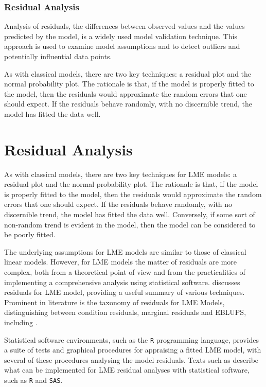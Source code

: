 \documentclass[12pt, a4paper]{report}
\theoremstyle{plain}
\theoremstyle{definition}
\theoremstyle{remark}
\begin{document}
\subsubsection{Residual Analysis}
Analysis of residuals, the differences between observed values and the values predicted by the model, is a widely used model validation technique. This approach is used to examine model assumptions and to detect outliers and potentially influential data points. 

As with classical models, there are two key techniques: a residual plot and the normal probability plot. The rationale is that, if the model is properly fitted to the model, then the residuals would approximate the random errors that one should expect. If the residuals behave randomly, with no discernible trend, the model has fitted the data well. 
	
\section{Residual Analysis}
As with classical models, there are two key techniques for LME models: a residual plot and the normal probability plot. The rationale is that, if the model is properly fitted to the model, then the residuals would approximate the random errors that one should expect.
If the residuals behave randomly, with no discernible trend, the model has fitted the data well. Conversely, if some sort of non-random trend is evident in the model, then the model can be considered to be poorly fitted. 

The underlying assumptions for LME models are similar to those of classical linear models. However, for LME models the matter of residuals are more complex, both from a theoretical point of view and from the practicalities of implementing a comprehensive analysis using statistical software. \citet{schabenberger} discusses residuals for LME model, providing a useful summary of various techniques. Prominent in literature is the taxonomy of residuals for LME Models, distinguishing between condition residuals, marginal residuals and EBLUPS, including \citet{hildenminton, schabenberger, west, NobreSinger2007}.  

Statistical software environments, such as the \texttt{R} programming language, provides a suite of tests and graphical procedures for appraising a fitted LME model, with several of these procedures analysing the model residuals. Texts such as \citet{PB,west,Galecki} describe what can be implemented for LME residual analyses with statistical software, such as \texttt{R} and \texttt{SAS}.
\end{document}
